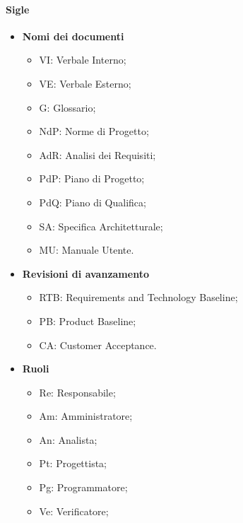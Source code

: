 \paragraph{Sigle}
\begin{itemize}
        \item \textbf{Nomi dei documenti}
                \begin{itemize}
                        \item VI: Verbale Interno;
                        \item VE: Verbale Esterno;
                        \item G: Glossario;
                        \item NdP: Norme di Progetto;
                        \item AdR: Analisi dei Requisiti;
                        \item PdP: Piano di Progetto;
                        \item PdQ: Piano di Qualifica;
                        \item SA: Specifica Architetturale;
                        \item MU: Manuale Utente.
                \end{itemize}
        \item \textbf{Revisioni di avanzamento}
                \begin{itemize}
                        \item RTB: Requirements and Technology Baseline;
                        \item PB: Product Baseline;
                        \item CA: Customer Acceptance.
                \end{itemize}
        \item \textbf{Ruoli}
                \begin{itemize}
                        \item Re: Responsabile;
                        \item Am: Amministratore;
                        \item An: Analista;
                        \item Pt: Progettista;
                        \item Pg: Programmatore;
                        \item Ve: Verificatore;
                \end{itemize}
\end{itemize}

